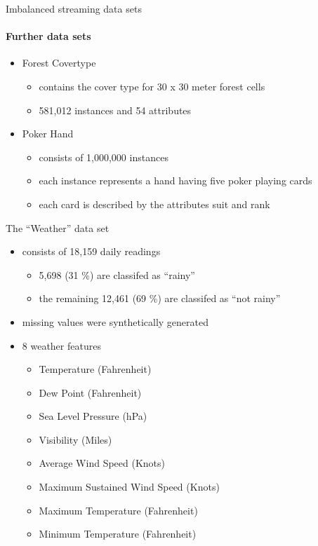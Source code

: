 
\begin{frame}{Imbalanced streaming data sets}
\framesubtitle{Further data sets}

\begin{itemize}
    \item Forest Covertype
    \begin{itemize}
        \item contains the cover type for 30 x 30 meter forest cells
        \item 581,012 instances and 54 attributes
    \end{itemize}
    \item Poker Hand
    \begin{itemize}
        \item consists of 1,000,000 instances
        \item each instance represents a hand having five poker playing cards
        \item each card is described by the attributes suit and rank
    \end{itemize}
\end{itemize}

\end{frame}


\begin{frame}{The \enquote{Weather} data set}

\begin{itemize}
    \item consists of 18,159 daily readings
    \begin{itemize}
        \item 5,698 (31 \%) are classifed as \enquote{rainy}
        \item the remaining 12,461 (69 \%) are classifed as \enquote{not rainy}
    \end{itemize}
    \item missing values were synthetically generated
    \item 8 weather features
    \begin{itemize}
        \item Temperature (Fahrenheit)
        \item Dew Point (Fahrenheit)
        \item Sea Level Pressure (hPa)
        \item Visibility (Miles)
        \item Average Wind Speed (Knots)
        \item Maximum Sustained Wind Speed (Knots)
        \item Maximum Temperature (Fahrenheit)
        \item Minimum Temperature (Fahrenheit)
    \end{itemize}
\end{itemize}

\end{frame}

